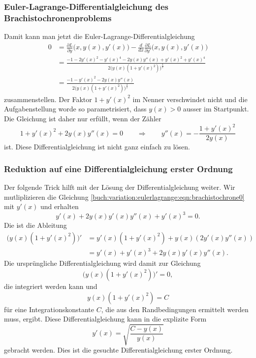 \subsubsection{Euler-Lagrange-Differentialgleichung des
Brachistochronenproblems}
Damit kann man jetzt die Euler-Lagrange-Differentialgleichung
\begin{align*}
0
&=
\frac{\partial L}{\partial y}\bigl(x,y(x),y'(x)\bigr)
-
\frac{d}{dx}
\frac{\partial L}{\partial y'}\bigl(x,y(x),y'(x)\bigr)
\\
&=
\frac{
-1 - 2y'(x)^2 - y'(x)^4
-2y(x)y''(x)+y'(x)^2+y'(x)^4
}{
2
\bigl(
y(x)
(1+y'(x)^2)
\bigr)^{\frac32}
}
\\
&=
\frac{
-1 - y'(x)^2
-2y(x)y''(x)
}{
2
\bigl(
y(x)
(1+y'(x)^2)
\bigr)^{\frac32}
}
\end{align*}
zusammenstellen.
Der Faktor $1+y'(x)^2$ im Nenner verschwindet nicht und die
Aufgabenstellung worde so parametrisiert, dass $y(x)>0$ ausser
im Startpunkt.
Die Gleichung ist daher nur erfüllt, wenn der Zähler
\begin{equation}
1+y'(x)^2+2y(x)y''(x)=0
\qquad\Rightarrow\qquad
y''(x)
=
-\frac{1+y'(x)^2}{2y(x)}
\label{buch:variation:eulerlagrange:eqn:brachistochrone0}
\end{equation}
ist.
Diese Differentialgleichung ist nicht ganz einfach zu lösen.

%
%
\subsubsection{Reduktion auf eine Differentialgleichung erster Ordnung}
Der folgende Trick hilft mit der Lösung der Differentialgleichung weiter.
Wir mutliplizieren die Gleichung
\eqref{buch:variation:eulerlagrange:eqn:brachistochrone0}
mit $y'(x)$ und erhalten
\begin{equation}
y'(x) + 2y(x)y'(x)y''(x) + y'(x)^3 = 0.
\label{buch:variation:eulerlagrange:eqn:multiplikation}
\end{equation}
Die ist die Ableitung
\begin{align*}
\bigl(
y(x)(1+y'(x)^2)
\bigr)'
&=
y'(x)(1+y'(x)^2)
+
y(x)(2y'(x)y''(x))
\\
&=
y'(x) + y'(x)^3
+2y(x)y'(x)y''(x).
\end{align*}
Die ursprüngliche Differentialgleichung wird damit zur Gleichung
\[
\bigl(
y(x)(1+y'(x)^2)
\bigr)'
=
0,
\]
die integriert werden kann und
\[
y(x)(1+y'(x)^2)
=
C
\]
für eine Integrationskonstante $C$, die aus den Randbedingungen
ermittelt werden muss, ergibt.
Diese Differentialgleichung kann in die explizite Form
\begin{equation}
y'(x)
=
\sqrt{
\frac{C-y(x)}{y(x)}
}
\label{buch:variation:eulerlagrange:eqn:brachistochrone1}
\end{equation}
gebracht werden.
Dies ist die gesuchte Differentialgleichung erster Ordnung.


